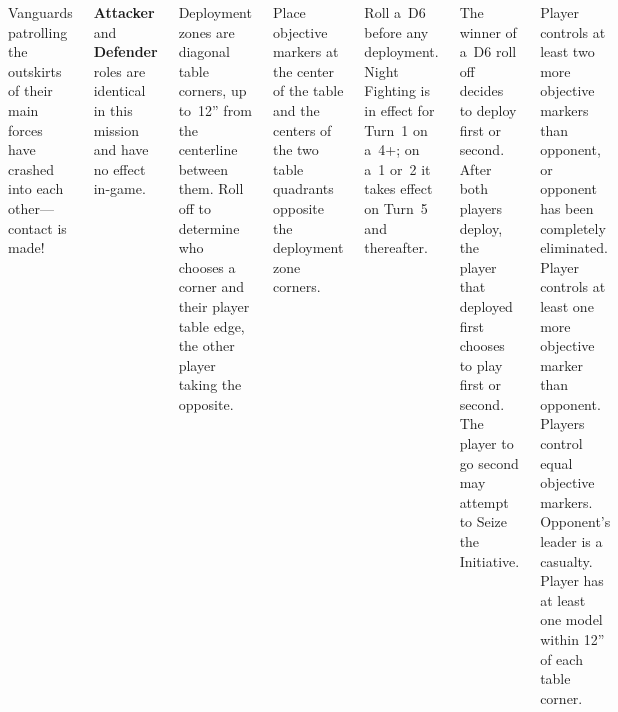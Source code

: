 
\begin{columns}

  Vanguards patrolling the outskirts of their main forces have crashed
  into each other---contact is made!

  \textbf{Attacker} and \textbf{Defender} roles are identical in this
  mission and have no effect in-game.

%


Deployment zones are diagonal table corners, up to~12'' from the
centerline between them.  Roll off to determine who chooses a corner
and their player table edge, the other player taking the opposite.

Place objective markers at the center of the table and the centers of
the two table quadrants opposite the deployment zone corners.

Roll a~D6 before any deployment.  Night Fighting is in effect for
Turn~1 on a~4+; on a~1 or~2 it takes effect on Turn~5 and thereafter.

%

The winner of a~D6 roll off decides to deploy first or second.  After
both players deploy, the player that deployed first chooses to play
first or second.  The player to go second may attempt to Seize the
Initiative.


\columnbreak

\scoringbox
{Player controls at least
  two more objective markers than opponent, or opponent has been
  completely eliminated.}
{Player controls at least one more
                       objective marker than opponent.}
{Players control equal objective markers.}
{Opponent's leader is a casualty.}
{Player has at least one model within 12'' of each table corner.}

\end{columns}
